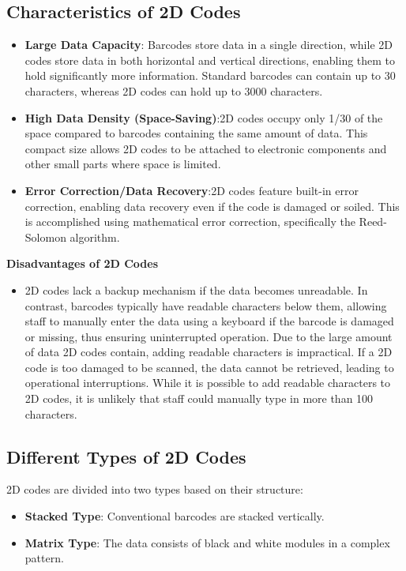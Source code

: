 \subsection{Characteristics of 2D Codes}
\begin{itemize}
	\item \textbf{Large Data Capacity}: Barcodes store data in a single direction, while 2D codes store data in both horizontal and vertical directions, enabling them to hold significantly more information. Standard barcodes can contain up to 30 characters, whereas 2D codes can hold up to 3000 characters.
	
	\item \textbf{High Data Density (Space-Saving)}:2D codes occupy only 1/30 of the space compared to barcodes containing the same amount of data. This compact size allows 2D codes to be attached to electronic components and other small parts where space is limited.
	\item \textbf{Error Correction/Data Recovery}:2D codes feature built-in error correction, enabling data recovery even if the code is damaged or soiled. This is accomplished using mathematical error correction, specifically the Reed-Solomon algorithm.\cite{2Dcodes2024}
\end{itemize}

\textbf{Disadvantages of 2D Codes}
\begin{itemize}
	\item 2D codes lack a backup mechanism if the data becomes unreadable. In contrast, barcodes typically have readable characters below them, allowing staff to manually enter the data using a keyboard if the barcode is damaged or missing, thus ensuring uninterrupted operation. Due to the large amount of data 2D codes contain, adding readable characters is impractical. If a 2D code is too damaged to be scanned, the data cannot be retrieved, leading to operational interruptions. While it is possible to add readable characters to 2D codes, it is unlikely that staff could manually type in more than 100 characters.
\end{itemize}

\subsection{Different Types of 2D Codes}
2D codes are divided into two types based on their structure:
\begin{itemize}
	\item \textbf{Stacked Type}: Conventional barcodes are stacked vertically.
	\item \textbf{Matrix Type}: The data consists of black and white modules in a complex pattern.
\end{itemize}

